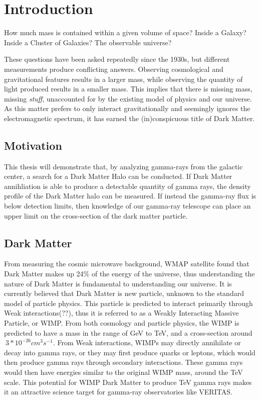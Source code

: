 \cleartooddpage[\thispagestyle{empty}]
\chapter{Introduction}

How much mass is contained within a given volume of space?
Inside a Galaxy?
Inside a Cluster of Galaxies?
The observable universe?

These questions have been asked repeatedly since the 1930s, but different measurements produce conflicting answers.
Observing cosmological and gravitational features results in a larger mass, while observing the quantity of light produced results in a smaller mass.
This implies that there is missing mass, missing \textit{stuff}, unaccounted for by the existing model of physics and our universe.
As this matter prefers to only interact gravitationally and seemingly ignores the electromagnetic spectrum, it has earned the (in)conspicuous title of Dark Matter.

\section{Motivation}
This thesis will demonstrate that, by analyzing gamma-rays from the galactic center, a search for a Dark Matter Halo can be conducted.
If Dark Matter annihliation is able to produce a detectable quantity of gamma rays, the density profile of the Dark Matter halo can be measured.
If instead the gamma-ray flux is below detection limits, then knowledge of our gamma-ray telescope can place an upper limit on the cross-section of the dark matter particle.

\section{Dark Matter}

From measuring the cosmic microwave background, WMAP satellite found that Dark Matter makes up 24\% of the energy of the universe\cite{pdg_2012}, thus understanding the nature of Dark Matter is fundamental to understanding our universe.
It is currently believed that Dark Matter is new particle, unknown to the standard model of particle physics.
This particle is predicted to interact primarily through Weak interactions(??), thus it is referred to as a Weakly Interacting Massive Particle, or WIMP.
From both cosmology and particle physics, the WIMP is predicted to have a mass in the range of GeV to TeV, and a cross-section around $~3*10^{-26} cm^{3}s^{-1}$.
From Weak interactions, WIMPs may directly annihilate or decay into gamma rays, or they may first produce quarks or leptons, which would then produce gamma rays through secondary interactions.
These gamma rays would then have energies similar to the original WIMP mass, around the TeV scale.
This potential for WIMP Dark Matter to produce TeV gamma rays makes it an attractive science target for gamma-ray observatories like VERITAS.

